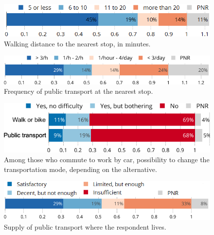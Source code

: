 \documentclass[english,5p,authoryear]{elsarticle}
\begin{document}


\begin{figure}[t]
\centering
\includegraphics[width=\columnwidth]{Images/transports_distance_trim.png}
\caption{Walking distance to the nearest stop, in minutes.}
\label{fig:transports_distance}
\end{figure}

\begin{figure}[t]
\centering
\includegraphics[width=\columnwidth]{Images/transports_frequency_trim.png}
\caption{Frequency of public transport at the nearest stop.}
\label{fig:transports_frequency}
\end{figure}

\begin{figure}[b]
\centering
\includegraphics[width=\columnwidth]{Images/transports_work.png}
\caption{Among those who commute to work by car, possibility to change the transportation mode, depending on the alternative.}
\label{fig:transports_work}
\end{figure}
    
\begin{figure}[t]
\centering
\includegraphics[width=\columnwidth]{Images/transports_opinion_trim.png}
\caption{Supply of public transport where the respondent lives.}
\label{fig:transports_opinion}
\end{figure}
\end{document}
